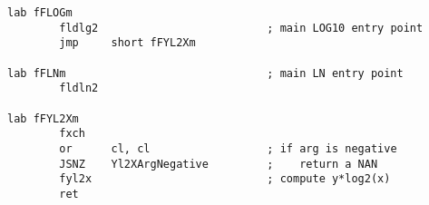 \begin{lstlisting}[caption=Assembly language code]
lab fFLOGm
        fldlg2                          ; main LOG10 entry point
        jmp     short fFYL2Xm

lab fFLNm                               ; main LN entry point
        fldln2

lab fFYL2Xm
        fxch
        or      cl, cl                  ; if arg is negative
        JSNZ    Yl2XArgNegative         ;    return a NAN
        fyl2x                           ; compute y*log2(x)
        ret
\end{lstlisting}


